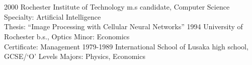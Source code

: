 \documentclass[]{friggeri-cv} %
\begin{document}

\section{{} {} {\normalsize {} ~~ }}

\begin{entrylist}
\entry
{2000}
{Rochester Institute of Technology}
{m.s candidate, Computer Science}
{Specialty: Artificial Intelligence\\
Thesis: ``Image Processing with Cellular Neural Networks''}
\entry
{1994}
{University of Rochester}
{b.s., Optics}
{Minor: Economics\\
Certificate: Management} 
\entry
{1979-1989}
{International School of Lusaka}
{high school, GCSE/`O' Levels}
{Majors: Physics, Economics}
\end{entrylist}
\end{document}
